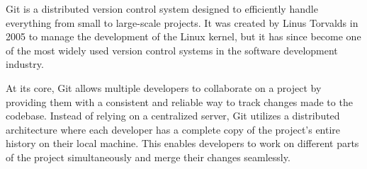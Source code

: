 \documentclass{artical}
\begin{document}
Git is a distributed version control system designed to efficiently handle everything from small to large-scale projects. It was created by Linus Torvalds in 2005 to manage the development of the Linux kernel, but it has since become one of the most widely used version control systems in the software development industry.

At its core, Git allows multiple developers to collaborate on a project by providing them with a consistent and reliable way to track changes made to the codebase. Instead of relying on a centralized server, Git utilizes a distributed architecture where each developer has a complete copy of the project's entire history on their local machine. This enables developers to work on different parts of the project simultaneously and merge their changes seamlessly.
\end{document}
